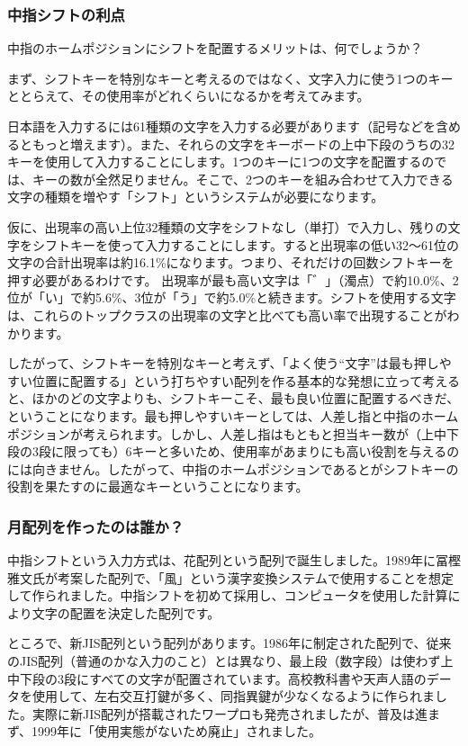 \subsubsection*{中指シフトの利点}

中指のホームポジションにシフトを配置するメリットは、何でしょうか？

まず、シフトキーを特別なキーと考えるのではなく、文字入力に使う1つのキーととらえて、その使用率がどれくらいになるかを考えてみます。

日本語を入力するには61種類の文字を入力する必要があります（記号などを含めるともっと増えます）。また、それらの文字をキーボードの上中下段のうちの32キーを使用して入力することにします。1つのキーに1つの文字を配置するのでは、キーの数が全然足りません。そこで、2つのキーを組み合わせて入力できる文字の種類を増やす「シフト」というシステムが必要になります。

仮に、出現率の高い上位32種類の文字をシフトなし（単打）で入力し、残りの文字をシフトキーを使って入力することにします。すると出現率の低い32～61位の文字の合計出現率は約16.1\%になります。つまり、それだけの回数シフトキーを押す必要があるわけです。
出現率が最も高い文字は「゛」（濁点）で約10.0\%、2位が「い」で約5.6\%、3位が「う」で約5.0\%と続きます。シフトを使用する文字は、これらのトップクラスの出現率の文字と比べても高い率で出現することがわかります。

したがって、シフトキーを特別なキーと考えず、「よく使う“文字”は最も押しやすい位置に配置する」という打ちやすい配列を作る基本的な発想に立って考えると、ほかのどの文字よりも、シフトキーこそ、最も良い位置に配置するべきだ、ということになります。最も押しやすいキーとしては、人差し指と中指のホームポジションが考えられます。しかし、人差し指はもともと担当キー数が（上中下段の3段に限っても）6キーと多いため、使用率があまりにも高い役割を与えるのには向きません。したがって、中指のホームポジションであるとがシフトキーの役割を果たすのに最適なキーということになります。

\subsubsection*{月配列を作ったのは誰か？}

中指シフトという入力方式は、花配列という配列で誕生しました。1989年に冨樫雅文氏が考案した配列で、「風」という漢字変換システムで使用することを想定して作られました。中指シフトを初めて採用し、コンピュータを使用した計算により文字の配置を決定した配列です。

ところで、新JIS配列という配列があります。1986年に制定された配列で、従来のJIS配列（普通のかな入力のこと）とは異なり、最上段（数字段）は使わず上中下段の3段にすべての文字が配置されています。高校教科書や天声人語のデータを使用して、左右交互打鍵が多く、同指異鍵が少なくなるように作られました。実際に新JIS配列が搭載されたワープロも発売されましたが、普及は進まず、1999年に「使用実態がないため廃止」されました。

